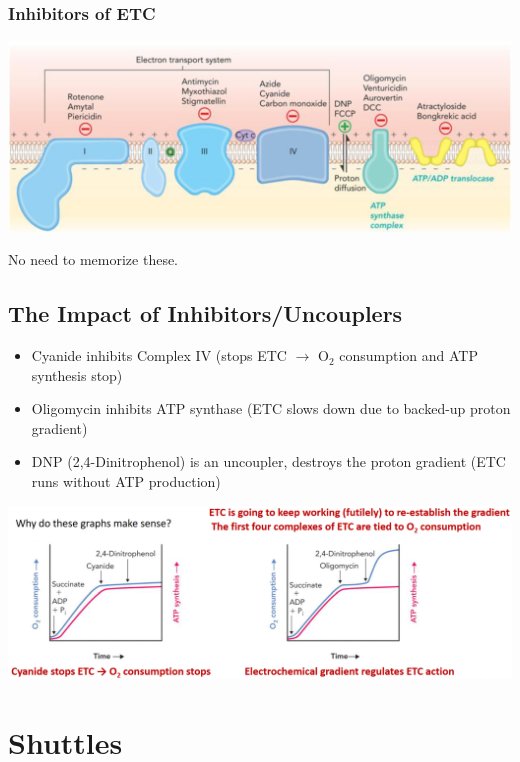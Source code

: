 \documentclass[10pt]{article}
\begin{document}
\subsubsection*{Inhibitors of ETC}
\begin{center} 
	\includegraphics*[width=\textwidth]{L3_9.png}
\end{center}
No need to memorize these.

\subsection*{The Impact of Inhibitors/Uncouplers}
\begin{itemize}
	\item Cyanide inhibits Complex IV (stops ETC $\rightarrow$ O$_2$ consumption and ATP synthesis stop)
	\item Oligomycin inhibits ATP synthase  (ETC slows down due to backed-up proton gradient)
	\item DNP (2,4-Dinitrophenol) is an uncoupler, destroys the proton gradient (ETC runs without ATP production)
\end{itemize}
\begin{center} 
	\includegraphics*[width=\textwidth]{L3_10.png}
\end{center}

\section*{Shuttles}
\end{document}
